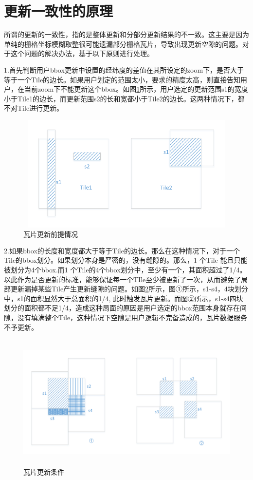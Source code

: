\section{更新一致性的原理}
所谓的更新的一致性，指的是整体更新和分部分更新结果的不一致。这主要是因为单纯的栅格坐标模糊取整很可能遗漏部分栅格瓦片，导致出现更新空隙的问题。对于这个问题的解决办法，基于以下原则进行处理。

1.首先判断用户bbox更新中设置的经纬度的差值在其所设定的zoom下，是否大于等于一个Tile的边长。如果用户划定的范围太小，要求的精度太高，则直接告知用户，在当前zoom下不能更新这个bbox。如图\ref{tile_consistency0}所示，用户选定的更新范围s1的宽度小于Tile1的边长，而更新范围s2的长和宽都小于Tile2的边长。这两种情况下，都不对Tile进行更新。

\begin{figure}[H]
  \centering
  \includegraphics[width=6in,height=2.3in]{new_FIGs/chapter4/tile_consistency0.pdf}
  \caption{瓦片更新前提情况}\label{tile_consistency0}
\end{figure}

2.如果bbox的长度和宽度都大于等于Tile的边长。那么在这种情况下，对于一个Tile的bbox划分。如果划分本身是严密的，没有缝隙的。那么，1 个Tile 能且只能被划分为4个bbox.而1 个Tile的4个bbox划分中，至少有一个，其面积超过了1/4。以此作为是否更新的标准，能够保证每一个TIle至少被更新了一次，从而避免了局部更新漏掉某些Tile产生更新缝隙的问题。如图\ref{tile_consistency2}所示，图①所示，s1-s4，4块划分中，s1的面积显然大于总面积的1/4, 此时触发瓦片更新。而图②所示，s1-s4四块划分的面积都不足1/4，造成这种局面的原因是用户选定的bbox范围本身就存在间隙，没有填满整个Tile，这种情况下空隙是用户逻辑不完备造成的，瓦片数据服务不予更新。

\begin{figure}[H]
  \centering
  \includegraphics[width=6in,height=2.7in]{new_FIGs/chapter4/tile_consistency2.pdf}
  \caption{瓦片更新条件}\label{tile_consistency2}
\end{figure}

